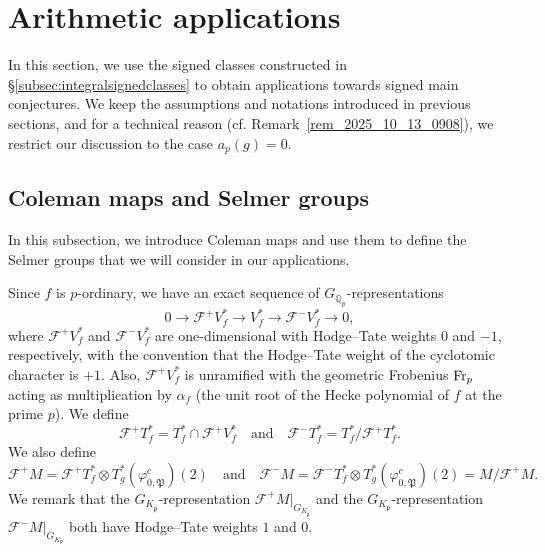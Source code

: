 \documentclass{amsart}
\numberwithin{equation}{section}
\newcommand{\bb}{\mathbb}
\newcommand{\frk}{\mathfrak}
\newcommand{\Fr}{{\rm Fr}}
\begin{document}
\section{Arithmetic applications}
\label{sec:applications}
In this section, we use the signed classes constructed in \S\ref{subsec:integralsignedclasses} to obtain applications towards signed main conjectures. We keep the assumptions and notations introduced in previous sections, and for a technical reason (cf. Remark~\ref{rem_2025_10_13_0908}), we restrict our discussion to the case $a_p(g)=0$. 

\subsection{Coleman maps and Selmer groups}
\label{subsec_5_1_2025_11_02_1128}
In this subsection, we introduce Coleman maps and use them to define the Selmer groups that we will consider in our applications. 

Since $f$ is $p$-ordinary, we have an exact sequence of $G_{\bb{Q}_p}$-representations
\[
0\rightarrow \mathscr{F}^+V_f^\ast\rightarrow V_f^\ast \rightarrow \mathscr{F}^- V_f^\ast\rightarrow 0,
\]
where $\mathscr{F}^+V_f^\ast$ and $\mathscr{F}^-V_f^\ast$ are one-dimensional with Hodge--Tate weights $0$ and $-1$, respectively, with the convention that the Hodge--Tate weight of the cyclotomic character is $+1$. Also, $\mathscr{F}^+V_f^\ast$ is unramified with the geometric Frobenius $\Fr_p$ acting as multiplication by $\alpha_f$ (the unit root of the Hecke polynomial of $f$ at the prime $p$). We define
\[
\mathscr{F}^+T_f^\ast=T_f^\ast\cap \mathscr{F}^+V_f^\ast \quad \text{and} \quad \mathscr{F}^-T_f^\ast=T_f^\ast/\mathscr{F}^+T_f^\ast.
\]
We also define
\[
\mathscr{F}^+M=\mathscr{F}^+T_f^\ast\otimes T_g^\ast(\varphi_{0,\frk{P}}^c)(2) \quad \text{and} \quad \mathscr{F}^-M=\mathscr{F}^-T_f^\ast\otimes T_g^\ast(\varphi_{0,\frk{P}}^c)(2)=M/\mathscr{F}^+M.
\]
We remark that the $G_{K_{\overline{\frk{p}}}}$-representation $\mathscr{F}^+M\vert_{G_{K_{\overline{\frk{p}}}}}$ and the $G_{K_{\frk{p}}}$-representation $\mathscr{F}^-M\vert_{G_{K_{\frk{p}}}}$ both have Hodge{--}Tate weights $1$ and $0$.
\end{document}
